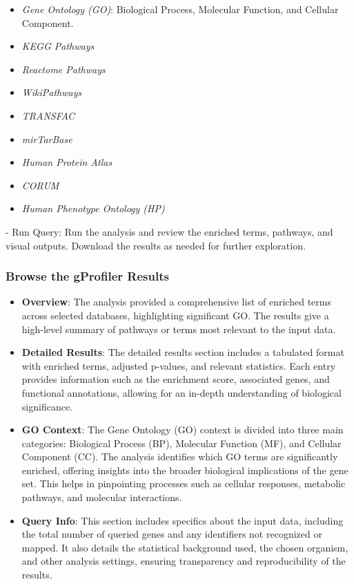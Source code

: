 \documentclass[
]{book}
\providecommand{\tightlist}{%
  \setlength{\itemsep}{0pt}\setlength{\parskip}{0pt}}
\begin{document}
\begin{itemize}
\tightlist
\item
  \emph{Gene Ontology (GO)}: Biological Process, Molecular Function, and Cellular Component.
\item
  \emph{KEGG Pathways}
\item
  \emph{Reactome Pathways}
\item
  \emph{WikiPathways}
\item
  \emph{TRANSFAC}
\item
  \emph{mirTarBase}
\item
  \emph{Human Protein Atlas}
\item
  \emph{CORUM}
\item
  \emph{Human Phenotype Ontology (HP)}
\end{itemize}

{- Run Query:} Run the analysis and review the enriched terms, pathways, and visual outputs. Download the results as needed for further exploration.

\hypertarget{browse-the-gprofiler-results}{%
\subsubsection{Browse the gProfiler Results}\label{browse-the-gprofiler-results}}

\begin{itemize}
\item
  \textbf{Overview}:
  The analysis provided a comprehensive list of enriched terms across selected databases, highlighting significant GO. The results give a high-level summary of pathways or terms most relevant to the input data.
\item
  \textbf{Detailed Results}:
  The detailed results section includes a tabulated format with enriched terms, adjusted p-values, and relevant statistics. Each entry provides information such as the enrichment score, associated genes, and functional annotations, allowing for an in-depth understanding of biological significance.
\item
  \textbf{GO Context}:
  The Gene Ontology (GO) context is divided into three main categories: Biological Process (BP), Molecular Function (MF), and Cellular Component (CC). The analysis identifies which GO terms are significantly enriched, offering insights into the broader biological implications of the gene set. This helps in pinpointing processes such as cellular responses, metabolic pathways, and molecular interactions.
\item
  \textbf{Query Info}:
  This section includes specifics about the input data, including the total number of queried genes and any identifiers not recognized or mapped. It also details the statistical background used, the chosen organism, and other analysis settings, ensuring transparency and reproducibility of the results.
\end{itemize}
\end{document}
